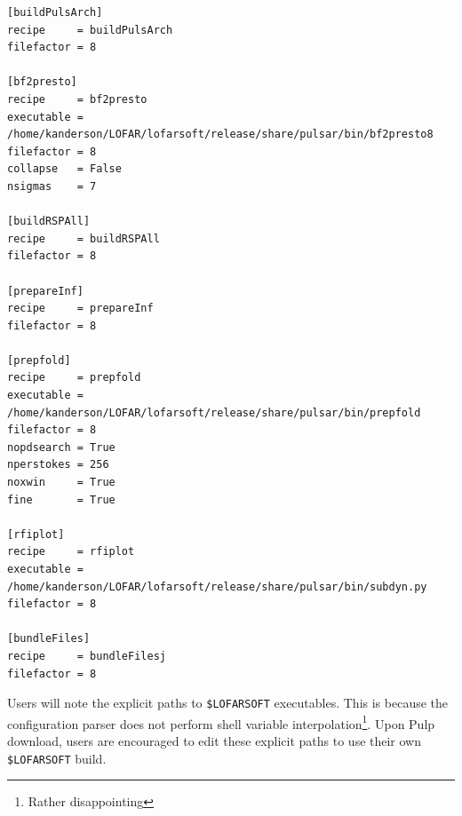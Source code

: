 \documentclass[a4paper,10pt,bibtotoc]{scrartcl}
\begin{document}
\begin{verbatim}
[buildPulsArch]
recipe     = buildPulsArch
filefactor = 8

[bf2presto]
recipe     = bf2presto
executable = /home/kanderson/LOFAR/lofarsoft/release/share/pulsar/bin/bf2presto8
filefactor = 8
collapse   = False
nsigmas    = 7

[buildRSPAll]
recipe     = buildRSPAll
filefactor = 8

[prepareInf]
recipe     = prepareInf
filefactor = 8

[prepfold]
recipe     = prepfold
executable = /home/kanderson/LOFAR/lofarsoft/release/share/pulsar/bin/prepfold
filefactor = 8
nopdsearch = True
nperstokes = 256
noxwin     = True
fine       = True

[rfiplot]
recipe     = rfiplot
executable = /home/kanderson/LOFAR/lofarsoft/release/share/pulsar/bin/subdyn.py
filefactor = 8

[bundleFiles]
recipe     = bundleFilesj
filefactor = 8
\end{verbatim}
Users will note the explicit paths to \verb|$LOFARSOFT| executables.
This is because the configuration parser does not perform shell variable
interpolation\footnote{Rather disappointing}.  Upon Pulp download, users are encouraged to edit these explicit paths to use their own \verb|$LOFARSOFT| build.
\
\end{document}

